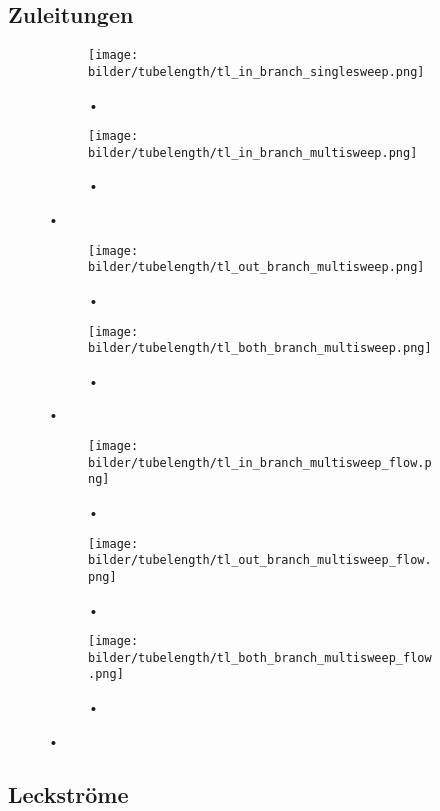 \documentclass[fontsize=12pt, a4paper]{scrartcl}
\begin{document}
\subsection{Zuleitungen}

\begin{figure}[H]
	\centering
	\begin{subfigure}[H]{0.48\textwidth}
		\texttt{[image: bilder/tubelength/tl\_in\_branch\_singlesweep.png]}
		\caption{•}
	\end{subfigure}
	\begin{subfigure}[H]{0.48\textwidth}
		\texttt{[image: bilder/tubelength/tl\_in\_branch\_multisweep.png]}
		\caption{•}
	\end{subfigure}
	\caption{•}
\end{figure}

\begin{figure}[H]
	\centering
	\begin{subfigure}[H]{0.48\textwidth}
		\texttt{[image: bilder/tubelength/tl\_out\_branch\_multisweep.png]}
		\caption{•}
	\end{subfigure}
	\begin{subfigure}[H]{0.48\textwidth}
		\texttt{[image: bilder/tubelength/tl\_both\_branch\_multisweep.png]}
		\caption{•}
	\end{subfigure}
	\caption{•}
\end{figure}

\begin{figure}[H]
	\centering
	\begin{subfigure}[H]{0.48\textwidth}
		\texttt{[image: bilder/tubelength/tl\_in\_branch\_multisweep\_flow.png]}
		\caption{•}
	\end{subfigure}
	\begin{subfigure}[H]{0.48\textwidth}
	\texttt{[image: bilder/tubelength/tl\_out\_branch\_multisweep\_flow.png]}
	\caption{•}
	\end{subfigure}
	\begin{subfigure}[H]{0.48\textwidth}
		\texttt{[image: bilder/tubelength/tl\_both\_branch\_multisweep\_flow.png]}
		\caption{•}
	\end{subfigure}
	\caption{•}
\end{figure}

\subsection{Leckströme}
\end{document}
